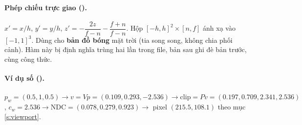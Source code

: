 \paragraph{Phép chiếu trực giao ().}
$x'=x/h$, $y'=y/h$, $z'=-\dfrac{2z}{f-n}-\dfrac{f+n}{f-n}$. Hộp $[-h,h]^2\times[n,f]$ ánh xạ vào $[-1,1]^3$. Dùng cho \textbf{bản đồ bóng} mặt trời (tia song song, không chia phối cảnh). Hàm này bị định nghĩa trùng hai lần trong file, bản sau ghi đè bản trước, cùng công thức.

\paragraph{Ví dụ số ().}
$p_w=(0.5,1,0.5)\to v=Vp=(0.109,0.293,-2.536)\to \mathrm{clip}=Pv=(0.197,0.709,2.341,2.536)$, $c_w=2.536\to\mathrm{NDC}=(0.078,0.279,0.923)\to$ pixel $(215.5,108.1)$ theo mục \ref{s:viewport}.

